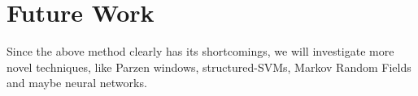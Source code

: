 \section{Future Work}
\label{sec:next}

Since the above method clearly has its shortcomings, we will investigate more novel techniques, like Parzen windows, structured-SVMs, Markov Random Fields and maybe neural networks.